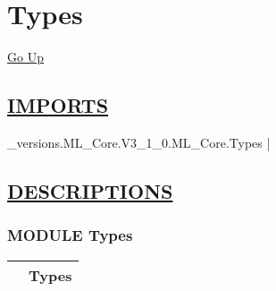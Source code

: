 \chapter*{\color{headfile}
Types
}
\hypertarget{ecldoc:toc:Types}{}
\hyperlink{ecldoc:toc:root}{Go Up}

\section*{\underline{\textsf{IMPORTS}}}
\begin{doublespace}
{\large
\_versions.ML\_Core.V3\_1\_0.ML\_Core.Types |
}
\end{doublespace}

\section*{\underline{\textsf{DESCRIPTIONS}}}
\subsection*{\textsf{\colorbox{headtoc}{\color{white} MODULE}
Types}}

\hypertarget{ecldoc:Types}{}

{\renewcommand{\arraystretch}{1.5}
\begin{tabularx}{\textwidth}{|>{\raggedright\arraybackslash}l|X|}
\hline
\hspace{0pt}\mytexttt{\color{red} } & \textbf{Types} \\
\hline
\end{tabularx}
}

\par


